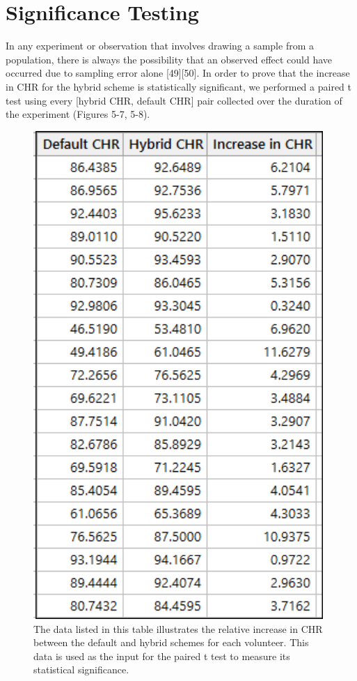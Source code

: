 \documentclass[12pt]{uthesis-v12}  %
\begin{document}
		\section{Significance Testing}
			In any experiment or observation that involves drawing a sample from a population, there is always the possibility that an observed effect could have occurred due to sampling error alone [49][50]. In order to prove that the increase in CHR for the hybrid scheme is statistically significant, we performed a paired t test using every [hybrid CHR, default CHR] pair collected over the duration of the experiment (Figures 5-7, 5-8).
			
			\begin{figure}[h]
				\centering
				\includegraphics[width = 110mm]{images/chrPairs.png}
				\caption[Relative Increase in CHR - Table]{The data listed in this table illustrates the relative increase in CHR between the default and hybrid schemes for each volunteer. This data is used as the input for the paired t test to measure its statistical significance.}
			\end{figure}
			
\end{document}
